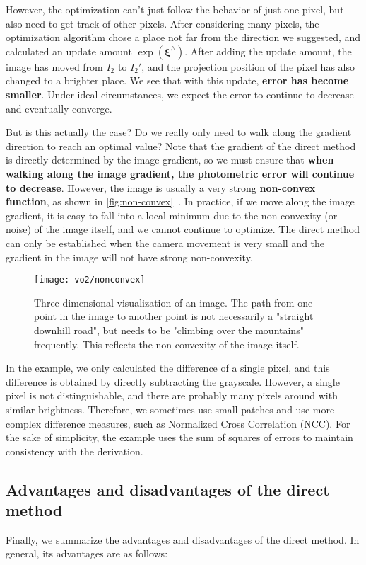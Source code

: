 However, the optimization can't just follow the behavior of just one pixel, but also need to get track of other pixels. After considering many pixels, the optimization algorithm chose a place not far from the direction we suggested, and calculated an update amount $\exp ({\mathbf{\xi}^\wedge} )$. After adding the update amount, the image has moved from $I_2$ to $I_2'$, and the projection position of the pixel has also changed to a brighter place. We see that with this update, \textbf{error has become smaller}. Under ideal circumstances, we expect the error to continue to decrease and eventually converge.

But is this actually the case? Do we really only need to walk along the gradient direction to reach an optimal value? Note that the gradient of the direct method is directly determined by the image gradient, so we must ensure that \textbf{when walking along the image gradient, the photometric error will continue to decrease}. However, the image is usually a very strong \textbf{non-convex function}, as shown in \autoref{fig:non-convex}~. In practice, if we move along the image gradient, it is easy to fall into a local minimum due to the non-convexity (or noise) of the image itself, and we cannot continue to optimize. The direct method can only be established when the camera movement is very small and the gradient in the image will not have strong non-convexity.

\begin{figure}[!htp]
	\centering
	\texttt{[image: vo2/nonconvex]}
	\caption{Three-dimensional visualization of an image. The path from one point in the image to another point is not necessarily a "straight downhill road", but needs to be "climbing over the mountains" frequently. This reflects the non-convexity of the image itself.}
	\label{fig:non-convex}
\end{figure}

In the example, we only calculated the difference of a single pixel, and this difference is obtained by directly subtracting the grayscale. However, a single pixel is not distinguishable, and there are probably many pixels around with similar brightness. Therefore, we sometimes use small patches and use more complex difference measures, such as Normalized Cross Correlation (NCC). For the sake of simplicity, the example uses the sum of squares of errors to maintain consistency with the derivation.

\subsection{Advantages and disadvantages of the direct method}
Finally, we summarize the advantages and disadvantages of the direct method. In general, its advantages are as follows:

